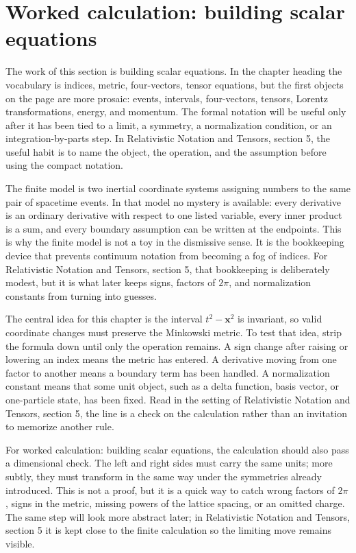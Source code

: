 \section{Worked calculation: building scalar equations}

The work of this section is building scalar equations.  In the chapter heading the vocabulary is indices, metric, four-vectors, tensor equations, but the first objects on the page are more prosaic: events, intervals, four-vectors, tensors, Lorentz transformations, energy, and momentum.  The formal notation will be useful only after it has been tied to a limit, a symmetry, a normalization condition, or an integration-by-parts step.  In Relativistic Notation and Tensors, section 5, the useful habit is to name the object, the operation, and the assumption before using the compact notation.

The finite model is two inertial coordinate systems assigning numbers to the same pair of spacetime events.  In that model no mystery is available: every derivative is an ordinary derivative with respect to one listed variable, every inner product is a sum, and every boundary assumption can be written at the endpoints.  This is why the finite model is not a toy in the dismissive sense.  It is the bookkeeping device that prevents continuum notation from becoming a fog of indices.  For Relativistic Notation and Tensors, section 5, that bookkeeping is deliberately modest, but it is what later keeps signs, factors of \(2\pi\), and normalization constants from turning into guesses.

The central idea for this chapter is the interval \(t^2-\bm x^2\) is invariant, so valid coordinate changes must preserve the Minkowski metric.  To test that idea, strip the formula down until only the operation remains.  A sign change after raising or lowering an index means the metric has entered.  A derivative moving from one factor to another means a boundary term has been handled.  A normalization constant means that some unit object, such as a delta function, basis vector, or one-particle state, has been fixed.  Read in the setting of Relativistic Notation and Tensors, section 5, the line is a check on the calculation rather than an invitation to memorize another rule.

For worked calculation: building scalar equations, the calculation should also pass a dimensional check.  The left and right sides must carry the same units; more subtly, they must transform in the same way under the symmetries already introduced.  This is not a proof, but it is a quick way to catch wrong factors of \(2\pi\), signs in the metric, missing powers of the lattice spacing, or an omitted charge.  The same step will look more abstract later; in Relativistic Notation and Tensors, section 5 it is kept close to the finite calculation so the limiting move remains visible.

